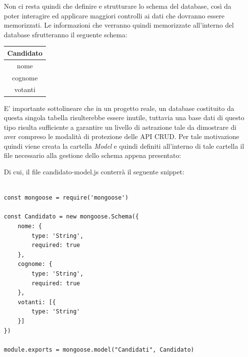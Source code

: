 \documentclass[twoside]{report}
\begin{document}
Non ci resta quindi che definire e strutturare lo schema del database, così da poter interagire ed applicare maggiori controlli ai dati che dovranno essere memorizzati.
\bigbreak
Le informazioni che verranno quindi memorizzate all'interno del database sfrutteranno il seguente schema:

\begin{table}[h]
\centering
\begin{tabular}{|c|}
\hline
\textbf{Candidato} \\ \hline
nome   \\ \hline
cognome  \\ \hline
votanti  \\ \hline
\end{tabular}
\end{table}
\FloatBarrier

E' importante sottolineare che in un progetto reale, un database costituito da questa singola tabella risulterebbe essere inutile, tuttavia una base dati di questo tipo risulta sufficiente a garantire un livello di astrazione tale da dimostrare di aver compreso le modalità di protezione delle API CRUD.
\bigbreak
Per tale motivazione quindi viene creata la cartella \textit{Model} e quindi definiti all'interno di tale cartella il file necessario alla gestione dello schema appena presentato:


\begin{center}

\end{center}

Di cui, il file candidato-model.js conterrà il seguente snippet:

\begin{listing}[h!]
\begin{verbatim}

const mongoose = require('mongoose')

const Candidato = new mongoose.Schema({
    nome: {
        type: 'String',
        required: true
    },
    cognome: {
        type: 'String',
        required: true
    },
    votanti: [{ 
        type: 'String'
    }]
})

module.exports = mongoose.model("Candidati", Candidato)
\end{verbatim}
\end{listing}
\FloatBarrier
\end{document}
